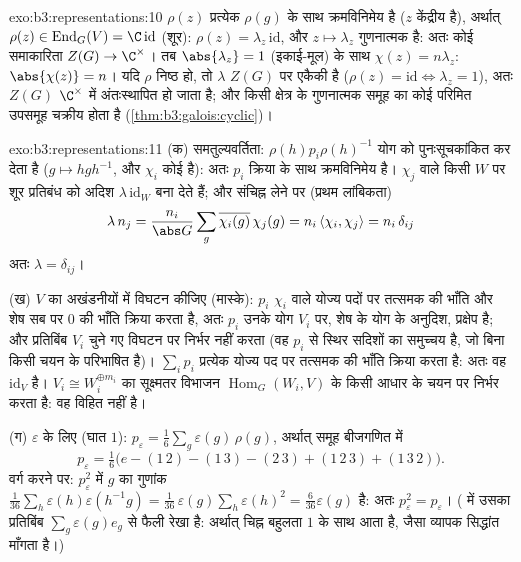 \begin{solution}{exo:b3:representations:10}
$\rho(z)$ प्रत्येक $\rho(g)$ के साथ क्रमविनिमेय है ($z$ केंद्रीय है),
अर्थात् $\rho(z) \in \operatorname{End}_G(V) = \C\,\mathrm{id}$ (शूर): $\rho(z) = \lambda_z\,\mathrm{id}$, और $z \mapsto \lambda_z$ गुणनात्मक है: अतः कोई समाकारिता
$Z(G) \to \C^\times$। तब $\abs{\lambda_z} = 1$ (इकाई-मूल) के साथ $\chi(z) = n\lambda_z$: $\abs{\chi(z)} = n$। यदि $\rho$ निष्ठ हो,
तो $\lambda$ $Z(G)$ पर एकैकी है ($\rho(z) = \mathrm{id} \iff \lambda_z =
1$), अतः $Z(G)$ $\C^\times$ में अंतःस्थापित
हो जाता है; और किसी क्षेत्र के गुणनात्मक समूह का कोई परिमित उपसमूह
चक्रीय होता है (\cref{thm:b3:galois:cyclic})।
\end{solution}

\begin{solution}{exo:b3:representations:11}
(क) समतुल्यवर्तिता: $\rho(h)p_i\rho(h)^{-1}$ योग को पुनःसूचकांकित कर देता है ($g \mapsto hgh^{-1}$,
और $\chi_i$ कोई  है): अतः $p_i$ क्रिया के साथ क्रमविनिमेय है।
 $\chi_j$ वाले किसी  $W$ पर शूर प्रतिबंध को अदिश $\lambda\,\mathrm{id}_W$
बना देते हैं; और संचिह्न लेने पर (प्रथम लांबिकता)
\[
\lambda\,n_j = \frac{n_i}{\abs G}\sum_g
\overline{\chi_i(g)}\,\chi_j(g) = n_i\,\langle\chi_i,
\chi_j\rangle = n_i\,\delta_{ij}
\]
अतः $\lambda = \delta_{ij}$।

(ख) $V$ का अखंडनीयों में विघटन कीजिए (मास्के): $p_i$  $\chi_i$
वाले योज्य पदों पर तत्समक की भाँति और शेष सब पर $0$ की भाँति क्रिया
करता है, अतः $p_i$ उनके योग $V_i$ पर, शेष के योग के अनुदिश, प्रक्षेप
है; और प्रतिबिंब $V_i$ चुने गए विघटन पर निर्भर नहीं करता (वह $p_i$
से स्थिर सदिशों का समुच्चय है, जो बिना किसी चयन के परिभाषित है)।
$\sum_ip_i$ प्रत्येक  योज्य पद पर तत्समक की भाँति क्रिया करता है:
अतः वह $\mathrm{id}_V$ है। $V_i \cong W_i^{\oplus m_i}$ का सूक्ष्मतर विभाजन $\operatorname{Hom}_G(W_i, V)$ के किसी आधार के
चयन पर निर्भर करता है: वह विहित नहीं है।

(ग) $\varepsilon$ के लिए (घात $1$): $p_\varepsilon =
\frac1{6}\sum_{g}\varepsilon(g)\,\rho(g)$, अर्थात् समूह बीजगणित में
\[
p_\varepsilon = \tfrac16\bigl(e - (1\,2) - (1\,3) - (2\,3)
+ (1\,2\,3) + (1\,3\,2)\bigr) .
\]
वर्ग करने पर: $p_\varepsilon^2$ में $g$ का गुणांक $\frac1{36}\sum_{h}\varepsilon(h)\varepsilon(h^{-1}g) =
\frac1{36}\,\varepsilon(g)\sum_h\varepsilon(h)^2 =
\frac{6}{36}\varepsilon(g)$ है: अतः $p_\varepsilon^2 =
p_\varepsilon$। ( में उसका प्रतिबिंब $\sum_g\varepsilon(g)e_g$ से फैली रेखा है: अर्थात् चिह्न
 बहुलता $1$ के साथ आता है, जैसा व्यापक सिद्धांत माँगता है।)
\end{solution}

